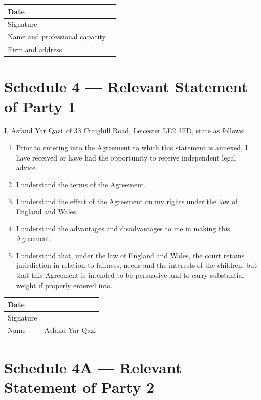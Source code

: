 \documentclass[10pt,a4paper]{article}
\newcommand{\PartyOne}{Asfand Yar Qazi}
\newcommand{\CurrentHome}{33 Craighill Road, Leicester LE2 3FD}
\begin{document}
\begin{tabularx}{\textwidth}{|Y|Y|}
\hline
Date & \\[0.8cm]
\hline
Signature & \\[1cm]
\hline
Name and professional capacity & \\[1cm]
\hline
Firm and address & \\[1.2cm]
\hline
\end{tabularx}

\newpage
\section*{Schedule 4 --- Relevant Statement of Party 1}

\noindent I, \PartyOne\ of \CurrentHome, state as follows:

\begin{enumerate}[label=\arabic*., leftmargin=1.8em]
    \item Prior to entering into the Agreement to which this statement is annexed, I have received or have had the opportunity to receive independent legal advice.
    \item I understand the terms of the Agreement.
    \item I understand the effect of the Agreement on my rights under the law of England and Wales.
    \item I understand the advantages and disadvantages to me in making this Agreement.
    \item I understand that, under the law of England and Wales, the court retains jurisdiction in relation to fairness, needs and the interests of the children, but that this Agreement is intended to be persuasive and to carry substantial weight if properly entered into.
\end{enumerate}

\vspace{0.8em}

\begin{tabularx}{\textwidth}{|Y|Y|}
\hline
Date & \\[0.8cm]
\hline
Signature & \\[1cm]
\hline
Name & \PartyOne \\[0.6cm]
\hline
\end{tabularx}

\newpage
\section*{Schedule 4A --- Relevant Statement of Party 2}
\end{document}

